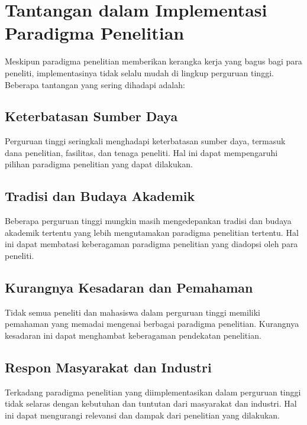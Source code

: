 \section{Tantangan dalam Implementasi Paradigma Penelitian}

Meskipun paradigma penelitian memberikan kerangka kerja yang bagus bagi para peneliti, implementasinya tidak selalu mudah di lingkup perguruan tinggi. Beberapa tantangan yang sering dihadapi adalah:

\subsection{Keterbatasan Sumber Daya}
Perguruan tinggi seringkali menghadapi keterbatasan sumber daya, termasuk dana penelitian, fasilitas, dan tenaga peneliti. Hal ini dapat mempengaruhi pilihan paradigma penelitian yang dapat dilakukan.

\subsection{Tradisi dan Budaya Akademik}
Beberapa perguruan tinggi mungkin masih mengedepankan tradisi dan budaya akademik tertentu yang lebih mengutamakan paradigma penelitian tertentu. Hal ini dapat membatasi keberagaman paradigma penelitian yang diadopsi oleh para peneliti.

\subsection{Kurangnya Kesadaran dan Pemahaman}
Tidak semua peneliti dan mahasiswa dalam perguruan tinggi memiliki pemahaman yang memadai mengenai berbagai paradigma penelitian. Kurangnya kesadaran ini dapat menghambat keberagaman pendekatan penelitian.

\subsection{Respon Masyarakat dan Industri}
Terkadang paradigma penelitian yang diimplementasikan dalam perguruan tinggi tidak selaras dengan kebutuhan dan tuntutan dari masyarakat dan industri. Hal ini dapat mengurangi relevansi dan dampak dari penelitian yang dilakukan.
